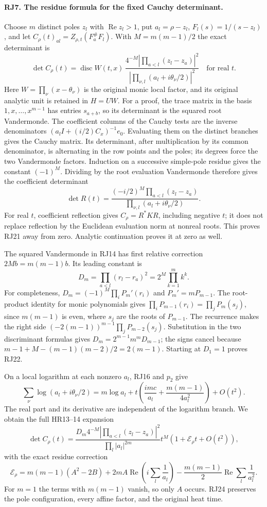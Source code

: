 \paragraph{RJ7. The residue formula for the fixed Cauchy determinant.}
Choose $m$ distinct poles $z_l$ with $\operatorname{Re}z_l>1$,
put $a_l=\rho-z_l$, $F_l(s)=1/(s-z_l)$, and let
$C_\rho(t)_{al}=Z_{\rho,t}(F_a^\#F_l)$.
With $M=m(m-1)/2$ the exact determinant is
\[
 \det C_\rho(t)=\operatorname{disc}W(t,x)\,
 \frac{4^{-M}|\prod_{a<l}(z_l-z_a)|^2}
      {|\prod_{\nu,l}(a_l+i\theta_\nu/2)|^2}
 \quad\text{for real }t.
 \tag{RJ21}
\]
Here $W=\prod_\nu(x-\theta_\nu)$ is the original monic local
factor, and its original analytic unit is retained in $H=UW$.
For a proof, the trace matrix in the basis $1,x,\ldots,x^{m-1}$
has entries $s_{a+b}$, so its determinant is the squared root
Vandermonde. The coefficient columns of the Cauchy tests are the
inverse denominators $(a_l I+(i/2)C_x)^{-1}e_0$. Evaluating them
on the distinct branches gives the Cauchy matrix. Its determinant,
after multiplication by its common denominator, is alternating in
the row points and the poles; its degrees force the two Vandermonde
factors. Induction on a successive simple-pole residue gives the
constant $(-1)^M$. Dividing by the root evaluation Vandermonde
therefore gives the coefficient determinant
\[
 \det R(t)=\frac{(-i/2)^M\prod_{a<l}(z_l-z_a)}
                     {\prod_{\nu,l}(a_l+i\theta_\nu/2)}.
\]
For real $t$, coefficient reflection gives $C_\rho=R^*KR$,
including negative $t$; it does not replace reflection by the
Euclidean evaluation norm at nonreal roots. This proves RJ21
away from zero. Analytic continuation proves it at zero as well.

The squared Vandermonde in RJ14 has first relative correction
$2Mb=m(m-1)b$. Its leading constant is
\[
 D_m=\prod_{a<l}(r_l-r_a)^2=2^M\prod_{k=1}^m k^k.
 \tag{RJ22}
\]
For completeness, $D_m=(-1)^M\prod_iP_m'(r_i)$ and
$P_m'=mP_{m-1}$. The root-product identity for monic polynomials
gives $\prod_iP_{m-1}(r_i)=\prod_jP_m(s_j)$, since $m(m-1)$
is even, where $s_j$ are the roots of $P_{m-1}$.
The recurrence makes the right side
$(-2(m-1))^{m-1}\prod_jP_{m-2}(s_j)$.
Substitution in the two discriminant formulas gives
$D_m=2^{m-1}m^mD_{m-1}$; the signs cancel because
$m-1+M-(m-1)(m-2)/2=2(m-1)$. Starting at $D_1=1$
proves RJ22.

On a local logarithm at each nonzero $a_l$, RJ16 and $p_2$
give
\[
 \sum_\nu\log(a_l+i\theta_\nu/2)
 =m\log a_l+t\left(\frac{imc}{a_l}
                    +\frac{m(m-1)}{4a_l^2}\right)+O(t^2).
\]
The real part and its derivative are independent of the logarithm
branch. We obtain the full HR13--14 expansion
\[
 \det C_\rho(t)=
 \frac{D_m4^{-M}|\prod_{a<l}(z_l-z_a)|^2}
      {\prod_l|a_l|^{2m}}
 t^M\left(1+\mathcal E_\rho t+O(t^2)\right),
 \tag{RJ23}
\]
with the exact residue correction
\[
 \boxed{\mathcal E_\rho=m(m-1)(A^2-2B)
       +2mA\operatorname{Re}\left(i\sum_l\frac1{a_l}\right)
       -\frac{m(m-1)}2\operatorname{Re}\sum_l\frac1{a_l^2}.}
 \tag{RJ24}
\]
For $m=1$ the terms with $m(m-1)$ vanish, so only $A$ occurs.
RJ24 preserves the pole configuration, every affine factor, and
the original heat time.

